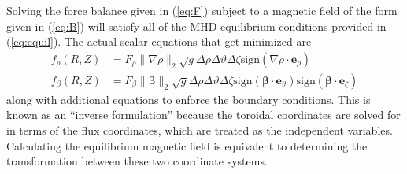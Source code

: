 \documentclass{article}
\newcommand{\er}{{\mathbf e}_{\rho}}
\newcommand{\ev}{{\mathbf e}_{\vartheta}}
\newcommand{\ez}{{\mathbf e}_{\zeta}}
\begin{document}
Solving the force balance given in (\ref{eq:F}) subject to a magnetic field of the form given in (\ref{eq:B}) will satisfy all of the MHD equilibrium conditions provided in (\ref{eq:equil}).
The actual scalar equations that get minimized are
%
\begin{subequations}
  \label{eq:f}
  \begin{align}
    f_\rho(R,Z) &= F_\rho \lVert\nabla\rho\rVert_2 \sqrt{g} \Delta\rho\Delta\vartheta\Delta\zeta \text{sign}\left(\nabla\rho\cdot\er\right) \\
    f_\beta(R,Z) &= F_\beta \lVert\mathbf{\beta}\rVert_2 \sqrt{g} \Delta\rho\Delta\vartheta\Delta\zeta \text{sign}\left(\mathbf{\beta}\cdot\ev\right) \text{sign}\left(\mathbf{\beta}\cdot\ez\right)
  \end{align}
\end{subequations}
%
along with additional equations to enforce the boundary conditions.
This is known as an ``inverse formulation'' because the toroidal coordinates are solved for in terms of the flux coordinates, which are treated as the independent variables.
Calculating the equilibrium magnetic field is equivalent to determining the transformation between these two coordinate systems.
\end{document}
